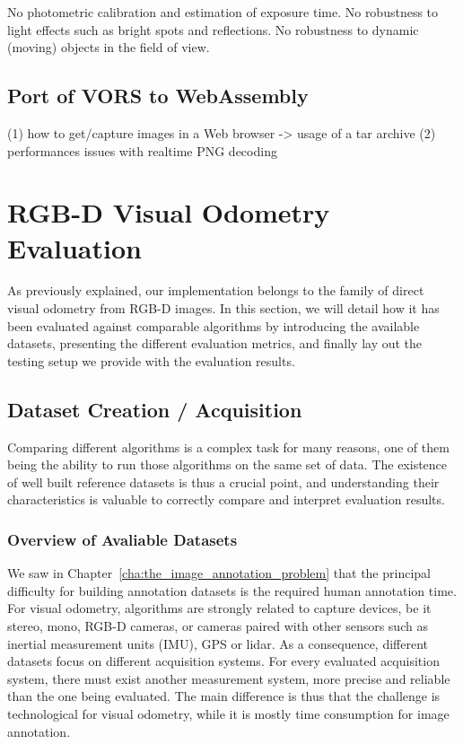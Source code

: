 No photometric calibration and estimation of exposure time.
No robustness to light effects such as bright spots and reflections.
No robustness to dynamic (moving) objects in the field of view.

\subsection{Port of VORS to WebAssembly}%
\label{sub:vors-port-wasm}

(1) how to get/capture images in a Web browser -> usage of a tar archive
(2) performances issues with realtime PNG decoding


\section{RGB-D Visual Odometry Evaluation}%
\label{sec:rgbd-vo-evaluation}

As previously explained, our implementation
belongs to the family of direct visual odometry from RGB-D images.
In this section, we will detail how it has been evaluated against
comparable algorithms by introducing the available datasets,
presenting the different evaluation metrics,
and finally lay out the testing setup we provide with the evaluation results.

\subsection{Dataset Creation / Acquisition}%
\label{sub:dataset_creation}

Comparing different algorithms is a complex task for many reasons,
one of them being the ability to run those algorithms on the same set of data.
The existence of well built reference datasets is thus a crucial point,
and understanding their characteristics is valuable to correctly compare and interpret
evaluation results.

\subsubsection{Overview of Avaliable Datasets}%
\label{ssub:datasets_overview}

We saw in Chapter~\ref{cha:the_image_annotation_problem} that the principal
difficulty for building annotation datasets is the required human annotation time.
For visual odometry, algorithms are strongly related to capture devices,
be it stereo, mono, RGB-D cameras, or cameras paired with other sensors
such as inertial measurement units (IMU), GPS or lidar.
As a consequence, different datasets focus on different acquisition systems.
For every evaluated acquisition system, there must exist another measurement system,
more precise and reliable than the one being evaluated.
The main difference is thus that
the challenge is technological for visual odometry,
while it is mostly time consumption for image annotation.

